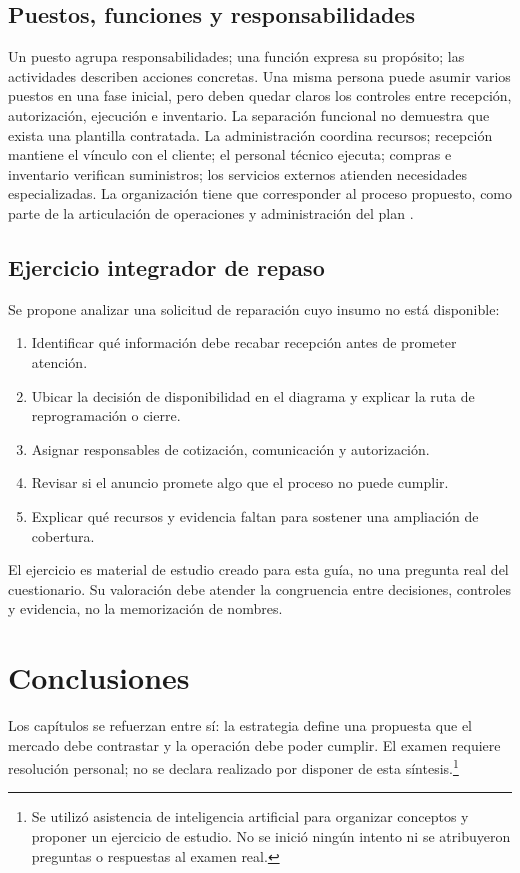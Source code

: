 {\subsection{Puestos, funciones y responsabilidades}
Un puesto agrupa responsabilidades; una función expresa su propósito; las actividades describen acciones concretas. Una misma persona puede asumir varios puestos en una fase inicial, pero deben quedar claros los controles entre recepción, autorización, ejecución e inventario. La separación funcional no demuestra que exista una plantilla contratada.
La administración coordina recursos; recepción mantiene el vínculo con el cliente; el personal técnico ejecuta; compras e inventario verifican suministros; los servicios externos atienden necesidades especializadas. La organización tiene que corresponder al proceso propuesto, como parte de la articulación de operaciones y administración del plan \citep{manualGuiaPlanNegocio}.
\subsection{Ejercicio integrador de repaso}
Se propone analizar una solicitud de reparación cuyo insumo no está disponible:
\begin{enumerate}
\item Identificar qué información debe recabar recepción antes de prometer atención.
\item Ubicar la decisión de disponibilidad en el diagrama y explicar la ruta de reprogramación o cierre.
\item Asignar responsables de cotización, comunicación y autorización.
\item Revisar si el anuncio promete algo que el proceso no puede cumplir.
\item Explicar qué recursos y evidencia faltan para sostener una ampliación de cobertura.
\end{enumerate}
El ejercicio es material de estudio creado para esta guía, no una pregunta real del cuestionario. Su valoración debe atender la congruencia entre decisiones, controles y evidencia, no la memorización de nombres.
\section{Conclusiones}
Los capítulos se refuerzan entre sí: la estrategia define una propuesta que el mercado debe contrastar y la operación debe poder cumplir. El examen requiere resolución personal; no se declara realizado por disponer de esta síntesis.\footnote{Se utilizó asistencia de inteligencia artificial para organizar conceptos y proponer un ejercicio de estudio. No se inició ningún intento ni se atribuyeron preguntas o respuestas al examen real.}
}
